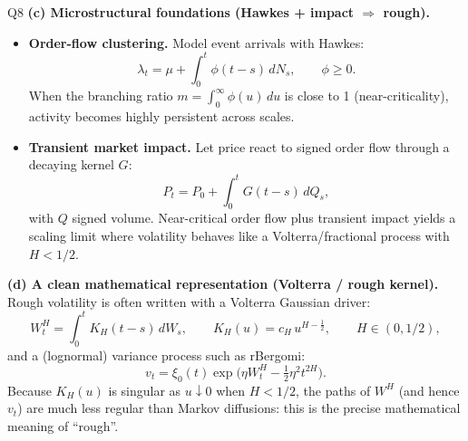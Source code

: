 \begin{solutionbox}{Q8}
\medskip
\textbf{(c) Microstructural foundations (Hawkes + impact $\Rightarrow$ rough).}
\begin{itemize}[leftmargin=*]
  \item \textbf{Order-flow clustering.} Model event arrivals with Hawkes:
  \[
  \lambda_t=\mu+\int_0^t \phi(t-s)\,dN_s,\qquad \phi\ge 0.
  \]
  When the branching ratio \(m=\int_0^\infty \phi(u)\,du\) is close to 1 (near-criticality), activity becomes highly persistent across scales.
  \item \textbf{Transient market impact.} Let price react to signed order flow through a decaying kernel \(G\):
  \[
  P_t = P_0 + \int_0^t G(t-s)\,dQ_s,
  \]
  with \(Q\) signed volume. Near-critical order flow plus transient impact yields a scaling limit where volatility behaves like a Volterra/fractional process with \(H<1/2\).
\end{itemize}

\medskip
\textbf{(d) A clean mathematical representation (Volterra / rough kernel).}
Rough volatility is often written with a Volterra Gaussian driver:
\[
W_t^H=\int_0^t K_H(t-s)\,dW_s,
\qquad K_H(u)=c_H\,u^{H-\frac12},\qquad H\in(0,1/2),
\]
and a (lognormal) variance process such as rBergomi:
\[
v_t=\xi_0(t)\exp\!\Big(\eta W_t^H-\tfrac12\eta^2 t^{2H}\Big).
\]
Because \(K_H(u)\) is singular as \(u\downarrow 0\) when \(H<1/2\), the paths of \(W^H\) (and hence \(v_t\)) are much less regular than Markov diffusions: this is the precise mathematical meaning of ``rough''.
\end{solutionbox}

